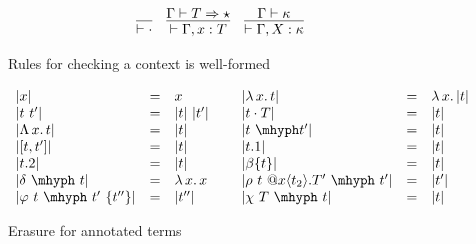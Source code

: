 \documentclass{article}
\newcommand{\absu}[3]{{#1}\, #2.\, #3}
\newcommand{\tpsynth}[0]{\Rightarrow}
\begin{document}
\begin{figure}
  \centering
  \[
    \begin{array}{lll}
      \infer{\vdash \cdot}{}
      & \infer{
        \vdash \Gamma,x:T
        }{\Gamma \vdash T \tpsynth \star}
      & \infer{
        \vdash \Gamma,X:\kappa
        }{
        \Gamma \vdash \kappa
        }
    \end{array}
  \]
  \caption{Rules for checking a context is well-formed}
  \label{fig:ctxt}
\end{figure}


\begin{figure}
  \[
  \begin{array}{lllllll}
    |x| & = & x &\ &
    |\absu{\lambda}{x}{t}| & = & \absu{\lambda}{x}{|t|} \\
    |t\ t'| & = & |t|\ |t'| &\ &
    |t\cdot T| & = & |t| \\
    |\absu{\Lambda}{x}{t}| & = & |t| &\ &
    |t\ \mhyph t'| & = & |t| \\
    |[t , t']| & = & |t| &\ &
    |t.1| & = & |t| \\
    |t.2| & = & |t| &\ &
    |\beta\{t\}| & = & |t|\\
    |\delta\ \mhyph\ t| & = & \absu{\lambda}{x}{x}&\ &
    |\rho\ t\ @x\langle t_2 \rangle.T'\ \mhyph\ t'| & = & |t'| \\
    |\varphi\ t\ \mhyph\ t'\ \{t''\}| & = & |t''| &\ &
    |\chi\ T\ \mhyph\ t| & = & |t|
  \end{array}
  \]
  \caption{Erasure for annotated terms}
  \label{fig:eraser}
\end{figure}  
\end{document}
